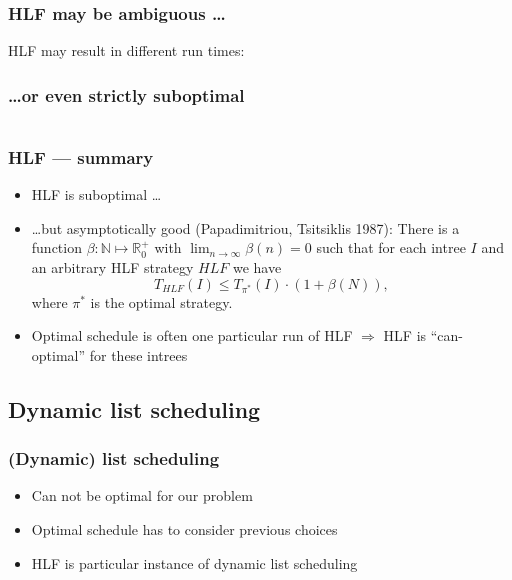 \documentclass{beamer}
\newcommand{\todo}[1]{ {\color{red}{#1} }}
\begin{document}
\begin{frame}
  \frametitle{HLF may be ambiguous \dots}
  HLF may result in different run times:
  \begin{block}{}
    
  \end{block}
\end{frame}

\begin{frame}
  \frametitle{\dots or even strictly suboptimal}
  \begin{columns}[ht]
    \begin{column}{.45\textwidth}
      \centering
      
    \end{column}
    \begin{column}{.45\textwidth}
      \centering
      
    \end{column}
  \end{columns}
\end{frame}

\begin{frame}
  \frametitle{HLF --- summary}
  \begin{itemize}
  \item HLF is suboptimal \dots
  \item \dots but asymptotically good (Papadimitriou, Tsitsiklis 1987): 
    \label{thm:quality-hlf-papadimitriou}
    There is a function $\beta: \mathbb{N} \mapsto \mathbb{R}^+_0$ with $\lim_{n\rightarrow \infty} \beta(n) = 0$ such that for each intree $I$ and an arbitrary HLF strategy $HLF$ we have
    \begin{equation*}
      T_{HLF}(I) \leq T_{\pi^*}(I) \cdot \left( 1+\beta(N) \right),
    \end{equation*}
    where  $\pi^*$ is the optimal strategy.
  \item Optimal schedule is often one particular run of HLF\todo{Wie oft -- kurze Tabelle in Anhang!} $\Rightarrow$ HLF is ``can-optimal'' for these intrees
  \end{itemize}
\end{frame}

\subsection{Dynamic list scheduling}

\begin{frame}
  \frametitle{(Dynamic) list scheduling}
  \begin{itemize}
  \item Can not be optimal for our problem
  \item Optimal schedule has to consider previous choices
  \item HLF is particular instance of dynamic list scheduling
  \end{itemize}
\end{frame}
\end{document}

